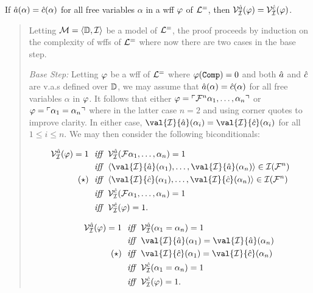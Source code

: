 \vspace{.05in}
\begin{Lthm} \label{lemma:VarAgree}
  If $\hat{a}(\alpha)=\hat{c}(\alpha)$ for all free variables $\alpha$ in a wff $\varphi$ of $\mathcal{L}^{=}$, then $\mathcal{V}_{\mathcal{I}}^{\hat{a}}(\varphi)=\mathcal{V}_{\mathcal{I}}^{\hat{c}}(\varphi)$.
\end{Lthm}

\begin{quote}
  Letting $\mathcal{M} = \langle\mathbb{D}, \mathcal{I}\rangle$ be a model of $\mathcal{L}^{=}$, the proof proceeds by induction on the complexity of wffs of $\mathcal{L}^{=}$ where now there are two cases in the base step.

  \textit{Base Step:}
  Letting $\varphi$ be a wff of $\mathcal{L}^{=}$ where $\varphi(\texttt{Comp}) = 0$ and both $\hat{a}$ and $\hat{c}$ are v.a.s defined over $\mathbb{D}$, we may assume that $\hat{a}(\alpha)=\hat{c}(\alpha)$ for all free variables $\alpha$ in $\varphi$.
  It follows that either $\varphi = \ulcorner\mathcal{F}^n\alpha_1,\ldots,\alpha_n\urcorner$ or $\varphi = \ulcorner\alpha_1 = \alpha_n\urcorner$ where in the latter case $n = 2$ and using corner quotes to improve clarity.
  In either case, $\val{\I}{\va{a}}(\alpha_i) = \val{\I}{\va{c}}(\alpha_i)$ for all $1 \leq i \leq n$. 
  We may then consider the following biconditionals:

  \begin{multicols}{2}
  
    \begin{align*}
      \VV{\I}{\va{a}}(\metaA) = 1
        ~~\textit{iff}~~  & \VV{\I}{\va{a}}(\F\alpha_1,\ldots,\alpha_n) = 1\\
        ~~\textit{iff}~~  & \tuple{\val{\I}{\va{a}}(\alpha_1),\ldots,\val{\I}{\va{a}}(\alpha_n)} \in \I(\F^n)\\
        (\star) ~~\textit{iff}~~  & \tuple{\val{\I}{\va{c}}(\alpha_1),\ldots,\val{\I}{\va{c}}(\alpha_n)} \in \I(\F^n)\\
        ~~\textit{iff}~~  & \VV{\I}{\va{c}}(\F\alpha_1,\ldots,\alpha_n) = 1\\
        ~~\textit{iff}~~  & \VV{\I}{\va{c}}(\metaA) = 1.
    \end{align*}

    \begin{align*}
      \strut\quad\quad
      \VV{\I}{\va{a}}(\metaA) = 1
        ~~\textit{iff}~~  & \VV{\I}{\va{a}}(\alpha_1 = \alpha_n) = 1\\
        ~~\textit{iff}~~  & \val{\I}{\va{a}}(\alpha_1) = \val{\I}{\va{a}}(\alpha_n)\\
        (\star) ~~\textit{iff}~~  & \val{\I}{\va{c}}(\alpha_1) = \val{\I}{\va{c}}(\alpha_n)\\
        ~~\textit{iff}~~  & \VV{\I}{\va{c}}(\alpha_1 = \alpha_n) = 1\\
        ~~\textit{iff}~~  & \VV{\I}{\va{c}}(\metaA) = 1.
    \end{align*}


\end{multicols}
\end{quote}
